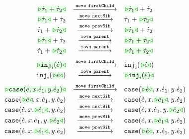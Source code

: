 \begin{figure}
\begin{displaymath}
\begin{array}{@{}rcl}
  \TABperformMove
      {\zwsel{\tsum{\htau_1}{\htau_2}}}
      {\aMove{\dChild}}
      {      {\tsum{\zwsel{\htau_1}}{\htau_2}}}
  \\
  \TABperformMove
      {      {\tsum{\zwsel{\htau_1}}{\htau_2}}}
      {\aMove{\dNext}}
      {      {\tsum{{\htau_1}}{\zwsel{\htau_2}}}}
  \\
  \TABperformMove
      {      {\tsum{{\htau_1}}{\zwsel{\htau_2}}}}
      {\aMove{\dPrev}}
      {      {\tsum{\zwsel{\htau_1}}{\htau_2}}}
  \\
  \TABperformMove
      {      {\tsum{\zwsel{\htau_1}}{\htau_2}}}
      {\aMove{\dParent}}
      {\zwsel{\tsum{{\htau_1}}{{\htau_2}}}}
  \\
  \TABperformMove
      {      {\tsum{{\htau_1}}{{\zwsel{\htau_2}}}}}
      {\aMove{\dParent}}
      {\zwsel{\tsum{{\htau_1}}{\htau_2}}}
  \\[2mm]
  \TABperformMove
      {\zwsel{\hinj{i}{\hexp}}}
      {\aMove{\dChild}}
      {\hinj{i}{\zwsel{\hexp}}}      
  \\
  \TABperformMove
      {\hinj{i}{\zwsel{\hexp}}}      
      {\aMove{\dParent}}
      {\zwsel{\hinj{i}{\hexp}}}
  \\[2mm]
  \TABperformMove
      {\zwsel{\hcase{\hexp}{x}{\hexp_1}{y}{\hexp_2}}}
      {\aMove{\dChild}}
      {      {\hcase{\zwsel{\hexp}}{x}{\hexp_1}{y}{\hexp_2}}}
  \\
  \TABperformMove
      {      {\hcase{\zwsel{\hexp}}{x}{\hexp_1}{y}{\hexp_2}}}
      {\aMove{\dNext}}
      {      {\hcase{{\hexp}}{x}{\zwsel{\hexp_1}}{y}{\hexp_2}}}
  \\
  \TABperformMove
      {      {\hcase{{\hexp}}{x}{\zwsel{\hexp_1}}{y}{\hexp_2}}}
      {\aMove{\dNext}}
      {      {\hcase{{\hexp}}{x}{{\hexp_1}}{y}{\zwsel{\hexp_2}}}}
  \\
  \TABperformMove
      {      {\hcase{{\hexp}}{x}{{\hexp_1}}{y}{\zwsel{\hexp_2}}}}
      {\aMove{\dPrev}}
      {      {\hcase{{\hexp}}{x}{\zwsel{\hexp_1}}{y}{\hexp_2}}}
  \\
  \TABperformMove
      {      {\hcase{{\hexp}}{x}{\zwsel{\hexp_1}}{y}{\hexp_2}}}
      {\aMove{\dPrev}}
      {      {\hcase{{\zwsel{\hexp}}}{x}{{\hexp_1}}{y}{{\hexp_2}}}}

\end{array}
\end{displaymath}
\end{figure}
